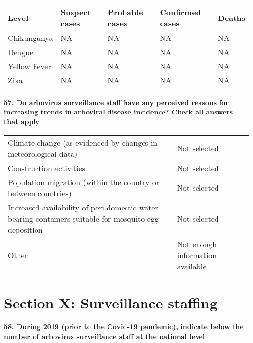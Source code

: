\documentclass[
]{article}
\begin{document}
\begin{longtable}[]{@{}lllll@{}}
\toprule
Level & Suspect cases & Probable cases & Confirmed cases & Deaths \\
\midrule
\endhead
Chikungunya & NA & NA & NA & NA \\
Dengue & NA & NA & NA & NA \\
Yellow Fever & NA & NA & NA & NA \\
Zika & NA & NA & NA & NA \\
\bottomrule
\end{longtable}

\hypertarget{do-arbovirus-surveillance-staff-have-any-perceived-reasons-for-increasing-trends-in-arboviral-disease-incidence-check-all-answers-that-apply}{%
\paragraph{57. Do arbovirus surveillance staff have any perceived
reasons for increasing trends in arboviral disease incidence? Check all
answers that
apply}\label{do-arbovirus-surveillance-staff-have-any-perceived-reasons-for-increasing-trends-in-arboviral-disease-incidence-check-all-answers-that-apply}}

\begin{longtable}[]{@{}
  >{\raggedright\arraybackslash}p{}
  >{\raggedright\arraybackslash}p{}@{}}
\toprule
\endhead
Climate change (as evidenced by changes in meteorological data) & Not
selected \\
Construction activities & Not selected \\
Population migration (within the country or between countries) & Not
selected \\
Increased availability of peri-domestic water-bearing containers
suitable for mosquito egg deposition & Not selected \\
Other & Not enough information available \\
\bottomrule
\end{longtable}

\hypertarget{section-x-surveillance-staffing}{%
\section{Section X: Surveillance
staffing}\label{section-x-surveillance-staffing}}

\hypertarget{during-2019-prior-to-the-covid-19-pandemic-indicate-below-the-number-of-arbovirus-surveillance-staff-at-the-national-level}{%
\paragraph{58. During 2019 (prior to the Covid-19 pandemic), indicate
below the number of arbovirus surveillance staff at the national
level}\label{during-2019-prior-to-the-covid-19-pandemic-indicate-below-the-number-of-arbovirus-surveillance-staff-at-the-national-level}}
\end{document}
